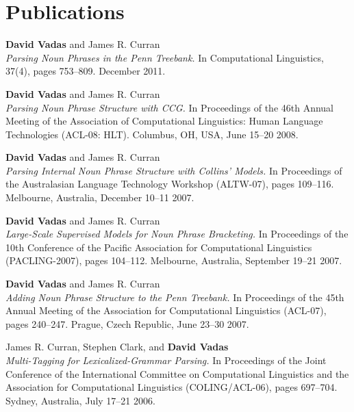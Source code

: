 \documentclass[]{article}
\begin{document}
\section*{Publications}

\textbf{David Vadas} and James R. Curran\\
\textit{Parsing Noun Phrases in the Penn Treebank.}
In Computational Linguistics, 37(4), pages 753--809.
December 2011.

\vbox{}

\textbf{David Vadas} and James R. Curran\\
\textit{Parsing Noun Phrase Structure with {CCG}.}
In Proceedings of the 46th Annual Meeting of the Association of Computational
Linguistics: Human Language Technologies (ACL-08: HLT).
Columbus, OH, USA, June 15--20 2008.

\vbox{}

\textbf{David Vadas} and James R. Curran\\
\textit{Parsing Internal Noun Phrase Structure with Collins' Models.}
In Proceedings of the Australasian Language Technology 
Workshop (ALTW-07), pages 109--116. Melbourne, Australia, December 10--11 2007.

\vbox{}

\textbf{David Vadas} and James R. Curran\\
\textit{Large-Scale Supervised Models for Noun Phrase Bracketing.}
In Proceedings of the 10th Conference of the Pacific Association for 
Computational Linguistics (PACLING-2007), pages 104--112. 
Melbourne, Australia, September 19--21 2007.

\vbox{}

\textbf{David Vadas} and James R. Curran\\
\textit{Adding Noun Phrase Structure to the Penn Treebank.} In
Proceedings of the 45th Annual Meeting of the Association for Computational 
Linguistics (ACL-07), pages 240--247. Prague, Czech Republic, June 23--30 2007. \\
 
\vbox{}

James R. Curran, Stephen Clark, and \textbf{David Vadas}\\
\textit{Multi-Tagging for Lexicalized-Grammar Parsing.} In
Proceedings of the Joint Conference of the International Committee on
Computational Linguistics and the Association for Computational Linguistics
(COLING/ACL-06), pages 697--704. Sydney, Australia, July 17--21 2006. \\  
\end{document}
